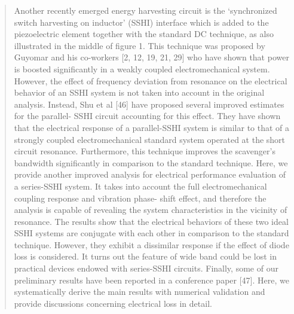 \documentclass{article}
\begin{document}
\begin{quote}
    Another recently emerged energy harvesting circuit is the
    ‘synchronized switch harvesting on inductor’ (SSHI) interface
    which is added to the piezoelectric element together with the
    standard DC technique, as also illustrated in the middle of
    figure 1. This technique was proposed by Guyomar and his
    co-workers [2, 12, 19, 21, 29] who have shown that power is
    boosted significantly in a weakly coupled electromechanical
    system. However, the effect of frequency deviation from
    resonance on the electrical behavior of an SSHI system is not
    taken into account in the original analysis. Instead, Shu et al
    [46] have proposed several improved estimates for the parallel-
    SSHI circuit accounting for this effect. They have shown that
    the electrical response of a parallel-SSHI system is similar to
    that of a strongly coupled electromechanical standard system
    operated at the short circuit resonance. Furthermore, this
    technique improves the scavenger’s bandwidth significantly
    in comparison to the standard technique. Here, we
    provide another improved analysis for electrical performance
    evaluation of a series-SSHI system. It takes into account the
    full electromechanical coupling response and vibration phase-
    shift effect, and therefore the analysis is capable of revealing
    the system characteristics in the vicinity of resonance. The
    results show that the electrical behaviors of these two ideal
    SSHI systems are conjugate with each other in comparison
    to the standard technique. However, they exhibit a dissimilar
    response if the effect of diode loss is considered. It turns out the
    feature of wide band could be lost in practical devices endowed
    with series-SSHI circuits. Finally, some of our preliminary
    results have been reported in a conference paper [47]. Here,
    we systematically derive the main results with numerical
    validation and provide discussions concerning electrical loss
    in detail.
    

\end{quote}
\end{document}
